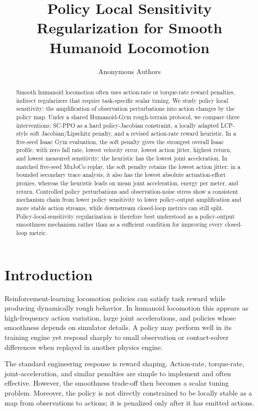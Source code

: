\documentclass[10pt]{article}
\title{Policy Local Sensitivity Regularization for Smooth Humanoid Locomotion}
\author{Anonymous Authors}
\date{}
\begin{document}
\maketitle

\begin{abstract}
Smooth humanoid locomotion often uses action-rate or torque-rate reward
penalties, indirect regularizers that require task-specific scalar tuning. We
study policy local sensitivity: the amplification of observation perturbations
into action changes by the policy map. Under a shared Humanoid-Gym rough-terrain
protocol, we compare three interventions: SC-PPO as a hard policy-Jacobian
constraint, a locally adapted LCP-style soft Jacobian/Lipschitz penalty, and a
revised action-rate reward heuristic. In a five-seed Isaac Gym evaluation, the
soft penalty gives the strongest overall Isaac profile, with zero fall rate,
lowest velocity error, lowest action jitter, highest return, and lowest measured
sensitivity; the heuristic has the lowest joint acceleration. In matched
five-seed MuJoCo replay, the soft penalty retains the lowest action jitter; in
a bounded secondary trace analysis, it also has the lowest absolute
actuation-effort proxies, whereas the heuristic leads on mean joint
acceleration, energy per meter, and return. Controlled policy
perturbations and observation-noise stress show a consistent mechanism chain
from lower policy sensitivity to lower policy-output amplification and more
stable action streams, while downstream closed-loop metrics can still split.
Policy-local-sensitivity regularization is therefore best understood as a
policy-output smoothness mechanism rather than as a sufficient condition for
improving every closed-loop metric.
\end{abstract}

\section{Introduction}

Reinforcement-learning locomotion policies can satisfy task reward while
producing dynamically rough behavior. In humanoid locomotion this appears as
high-frequency action variation, large joint accelerations, and policies whose
smoothness depends on simulator details. A policy may perform well in its
training engine yet respond sharply to small observation or contact-solver
differences when replayed in another physics engine.

The standard engineering response is reward shaping. Action-rate, torque-rate,
joint-acceleration, and similar penalties are simple to implement and often
effective. However, the smoothness trade-off then becomes a scalar tuning
problem. Moreover, the policy is not directly constrained to be locally stable
as a map from observations to actions; it is penalized only after it has emitted
actions.
\end{document}
